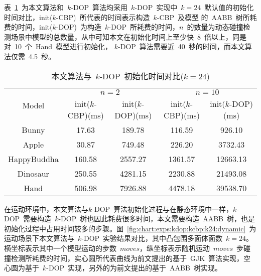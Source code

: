 表~\ref{tab:exper:kcbp:kdop:init:k24}~为本文算法和~$k$-DOP~算法均采用~$k$-DOP~实现中~$k=24$~默认值的初始化时间对比，init($k$-CBP)~所代表的时间表示构造~$k$-CBP~及模型
的~AABB~树所耗费的时间，init($k$-DOP)~为构造~$k$-DOP~所耗费的时间，$n$~的数量为动态碰撞检测场景中模型的总数量，从中可知本文在初始化时间上至少快~8~倍以上，同是对~10~个~Hand~模型进行初始化，
$k$-DOP~算法需要近~40~秒的时间，而本文算法仅需~4.5~秒。

\begin{table}[H]
\centering
\caption{本文算法与~$k$-DOP~初始化时间对比($k=24$)}
\label{tab:exper:kcbp:kdop:init:k24}
\begin{tabular}{ccccc}
\toprule[1.5pt]
\multirow{2}{*}{Model} & \multicolumn{2}{c}{$n=2$} &
\multicolumn{2}{c}{$n=10$}\\
\cmidrule(lr){2-3}\cmidrule(lr){4-5}
~&init($k$-CBP)(ms)&init($k$-DOP)(ms)& init($k$-CBP)(ms)&init($k$-DOP)(ms) \\
\midrule[1pt]
Bunny    &17.63  &189.78   &116.59 	  &926.10   	 \\
Apple    &30.87  &749.48   &226.20 	  &3732.43  	 \\
HappyBuddha	&160.58 	&2557.27 	&1361.57 	&12663.13  \\
Dinosaur &250.55 &4281.15  &2230.88	  &21493.08 	 \\
Hand	&506.98 &	7926.88 &	4478.18 &	39538.70 \\ 
\bottomrule[1.5pt]
\end{tabular}
\end{table}

在运动环境中，本文算法与$k$-DOP~算法初始化过程与在静态环境中一样，$k$-DOP~需要构造~$k$-DOP~树也因此耗费很多时间，本文需要构造~AABB~树，也是初始化过程中占用时间较多的步骤。图~\ref{fig:chart:exps:kdop:kcbp:k24:dynamic}~为运动场景下本文算法与~$k$-DOP~实验结果对比，其中凸包围多面体面数~$k=24$。
横坐标表示其中一个模型运动的步数~$moves$，纵坐标表示随机运动~$moves$~步碰撞检测所耗费的时间，实心圆所代表曲线为前文提出的基于~GJK~算法实现，空心圆为基于~$k$-DOP~实现，另外的为前文提出的基于~AABB~树实现。

